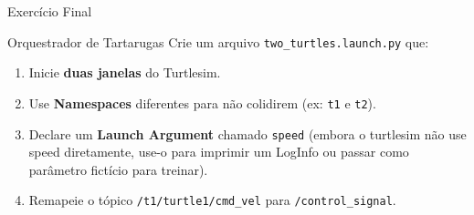 \begin{frame}[fragile]{Exercício Final}
  \begin{block}{Orquestrador de Tartarugas}
    Crie um arquivo \texttt{two\_turtles.launch.py} que:
  \end{block}
  \begin{enumerate}
    \item Inicie \textbf{duas janelas} do Turtlesim.
    \item Use \textbf{Namespaces} diferentes para não colidirem (ex: \texttt{t1} e \texttt{t2}).
    \item Declare um \textbf{Launch Argument} chamado \texttt{speed} (embora o turtlesim não use speed diretamente, use-o para imprimir um LogInfo ou passar como parâmetro fictício para treinar).
    \item Remapeie o tópico \texttt{/t1/turtle1/cmd\_vel} para \texttt{/control\_signal}.
  \end{enumerate}
\end{frame}
